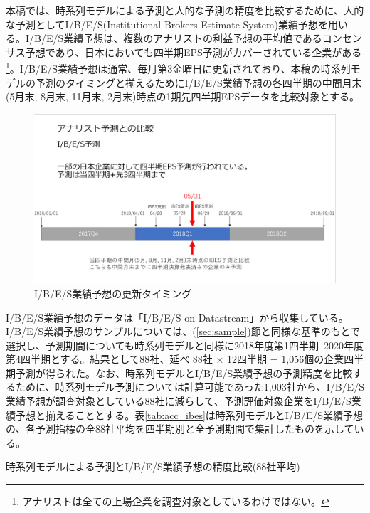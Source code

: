 \documentclass[a4paper, 12pt]{jsarticle}
\begin{document}
本稿では、時系列モデルによる予測と人的な予測の精度を比較するために、人的な予測としてI/B/E/S(Institutional Brokers Estimate System)業績予想を用いる。I/B/E/S業績予想は、複数のアナリストの利益予想の平均値であるコンセンサス予想であり、日本においても四半期EPS予測がカバーされている企業がある\footnote{アナリストは全ての上場企業を調査対象としているわけではない。}。I/B/E/S業績予想は通常、毎月第3金曜日に更新されており、本稿の時系列モデルの予測のタイミングと揃えるためにI/B/E/S業績予想の各四半期の中間月末(5月末, 8月末, 11月末, 2月末)時点の1期先四半期EPSデータを比較対象とする。

\begin{figure}
  \centering
  \caption{I/B/E/S業績予想の更新タイミング}
  \label{fig:ibes_timing}
  \includegraphics[width=12cm]{./img/_ibes_timing.png}
\end{figure}

I/B/E/S業績予想のデータは「I/B/E/S on Datastream」から収集している。I/B/E/S業績予想のサンプルについては、(\ref{sec:sample})節と同様な基準のもとで選択し、予測期間についても時系列モデルと同様に2018年度第1四半期~2020年度第4四半期とする。結果として88社、延べ 88社 × 12四半期 = 1,056個の企業四半期予測が得られた。なお、時系列モデルとI/B/E/S業績予想の予測精度を比較するために、時系列モデル予測については計算可能であった1,003社から、I/B/E/S業績予想が調査対象としている88社に減らして、予測評価対象企業をI/B/E/S業績予想と揃えることとする。表\ref{tab:acc_ibes}は時系列モデルとI/B/E/S業績予想の、各予測指標の全88社平均を四半期別と全予測期間で集計したものを示している。

\begin{landscape}
\begin{table}
    \caption{時系列モデルによる予測とI/B/E/S業績予想の精度比較(88社平均)}
    \label{tab:acc_ibes}
\end{table}
\end{landscape}
\end{document}
